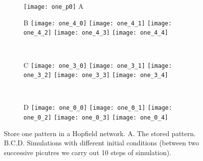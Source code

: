 \newpage
\null
\begin{figure}[h]
  \centering
  \begin{subfigure}{0.28\textwidth}
    \centering
    \texttt{[image: one\_p0]}
    \textsf{A}
  \end{subfigure}
  \hspace{0.7em}
  \begin{minipage}{0.62\textwidth}
    \begin{subfigure}{\textwidth}
      \textsf{B}
      \centering
      \texttt{[image: one\_4\_0]}
      \texttt{[image: one\_4\_1]}
      \texttt{[image: one\_4\_2]}
      \texttt{[image: one\_4\_3]}
      \texttt{[image: one\_4\_4]}
    \end{subfigure}\\[0.6em]
    \begin{subfigure}{\textwidth}
      \textsf{C}
      \centering
      \texttt{[image: one\_3\_0]}
      \texttt{[image: one\_3\_1]}
      \texttt{[image: one\_3\_2]}
      \texttt{[image: one\_3\_3]}
      \texttt{[image: one\_3\_4]}
    \end{subfigure}\\[0.6em]
    \begin{subfigure}{\textwidth}
      \textsf{D}
      \centering
      \texttt{[image: one\_0\_0]}
      \texttt{[image: one\_0\_1]}
      \texttt{[image: one\_0\_2]}
      \texttt{[image: one\_0\_3]}
      \texttt{[image: one\_0\_4]}
    \end{subfigure}
  \end{minipage}
  \vspace{1.2em}
  \caption{Store one pattern in a Hopfield network.
           \textsf{A.} The stored pattern.
           \textsf{B.C.D.} Simulations with different initial conditions
           (between two successive picutres we carry out 10 steps of
           simulation).}
  \label{fig: Hopfield_one}
\end{figure}

\vfill

